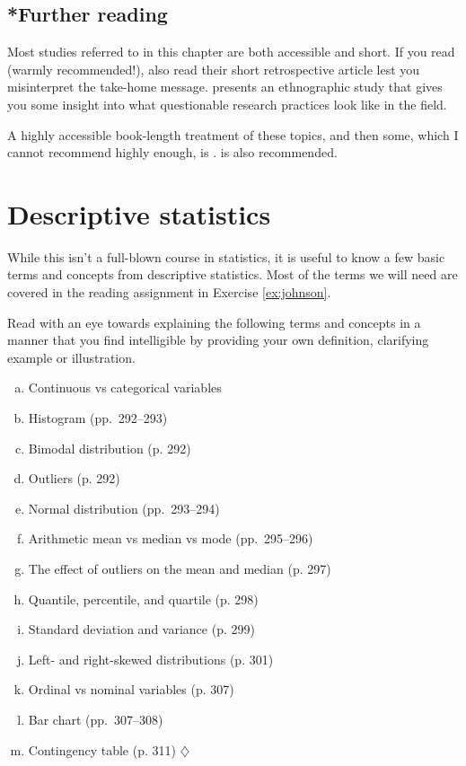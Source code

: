 \documentclass[a4paper]{tufte-book}\usepackage[]{graphicx}\usepackage[]{xcolor}
\newcommand*{\parend}[1][$\diamondsuit$]{%
  \unskip\nobreak\hspace{1em plus 1fill}$\diamondsuit$%
}
\begin{document}
\section{*Further reading}
Most studies referred to in this chapter are both accessible and short.
If you read \citet{Simmons2011} (warmly recommended!),
also read their short retrospective article \citep{Simmons2018}
lest you misinterpret the take-home message.
\citet{Peterson2016} presents an ethnographic study that gives
you some insight into what questionable research practices look like
in the field.

A highly accessible book-length treatment of these topics, and then some,
which I cannot recommend highly enough, is \citet{Ritchie2021}.
\citet{Chambers2017} is also recommended.

\appendix

\chapter{Descriptive statistics}
While this isn't a full-blown course in statistics, 
it is useful to know a few basic terms and concepts from descriptive statistics.
Most of the terms we will need are covered in the reading assignment in
Exercise \ref{ex:johnson}.

\label{ex:johnson}
Read \citet{Johnson2013} with an eye towards
explaining the following terms and
concepts in a manner that you find intelligible by providing
your own definition, clarifying example or illustration.

\begin{enumerate}[(a)]
 \item Continuous vs categorical variables \citep[pp.~289--290 in][]{Johnson2013}
 \item Histogram (pp.~292--293)
 \item Bimodal distribution (p. 292)
 \item Outliers (p. 292)
 \item Normal distribution (pp.~293--294)
 \item Arithmetic mean vs median vs mode (pp.~295--296)
 \item The effect of outliers on the mean and median (p. 297)
 \item Quantile, percentile, and quartile (p. 298)
 \item Standard deviation and variance (p. 299)
 \item Left- and right-skewed distributions (p. 301)
 \item Ordinal vs nominal variables (p. 307)
 \item Bar chart (pp.~307--308)
 \item Contingency table (p. 311) \parend
\end{enumerate}
\medskip
\end{document}
